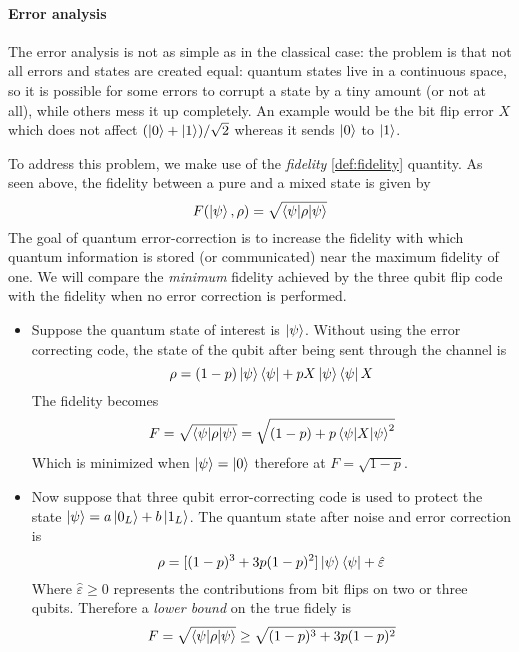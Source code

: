 \documentclass[11pt,a4paper]{article}
\theoremstyle{definition}
\theoremstyle{plain}
\theoremstyle{remark}
\begin{document}
\paragraph{Error analysis}

The error analysis is not as simple as in the classical case: the problem is that not all errors and states are created equal: 
quantum states live in a continuous space, so it is possible for some errors to corrupt a state by a tiny amount (or not at all), while others mess it up completely.
An example would be the bit flip error $X$ which does not affect $(\ket{0} + \ket{1}) / \sqrt{2}$ whereas it sends $\ket{0}$ to $\ket{1}$. 

To address this problem, we make use of the \emph{fidelity} \ref{def:fidelity} quantity. As seen above, the fidelity between a pure and a mixed state is given by 
$$ F(\ket{\psi}, \rho) = \sqrt{\braket{\psi | \rho | \psi}}$$
The goal of quantum error-correction is to increase the fidelity with which quantum information is stored (or communicated) near the maximum fidelity of one. 
We will compare the \emph{minimum} fidelity achieved by the three qubit flip code with the fidelity when no error correction is performed. 
\begin{itemize}
  \item Suppose the quantum state of interest is $\ket{\psi}$. Without using the error correcting code, the state of the qubit after being sent through the channel is
    $$ \rho = (1-p) \ket{\psi} \bra{\psi} + p X \ket{\psi} \bra{\psi} X$$ 
    The fidelity becomes 
    $$F = \sqrt{\braket{\psi | \rho | \psi}} = \sqrt{(1-p) + p \braket{\psi | X | \psi}^2}$$
    Which is minimized when $\ket{\psi} = \ket{0}$ therefore at $F = \sqrt{1 - p}$. 

  \item Now suppose that three qubit error-correcting code is used to protect the state $\ket{\psi} = a \ket{0_L} + b \ket{1_L}$. The quantum state after noise and error correction is 
  $$\rho = [(1-p)^3 + 3p(1-p)^2] \ket{\psi} \bra{\psi} + \hat{\varepsilon}$$
  Where $\hat{\varepsilon} \geq 0$ represents the contributions from bit flips on two or three qubits. Therefore a \emph{lower bound} on the true fidely is 
  $$F = \sqrt{\braket{\psi | \rho | \psi}} \geq \sqrt{(1-p)^3 + 3p(1-p)^2}$$
\end{itemize}
\end{document}
